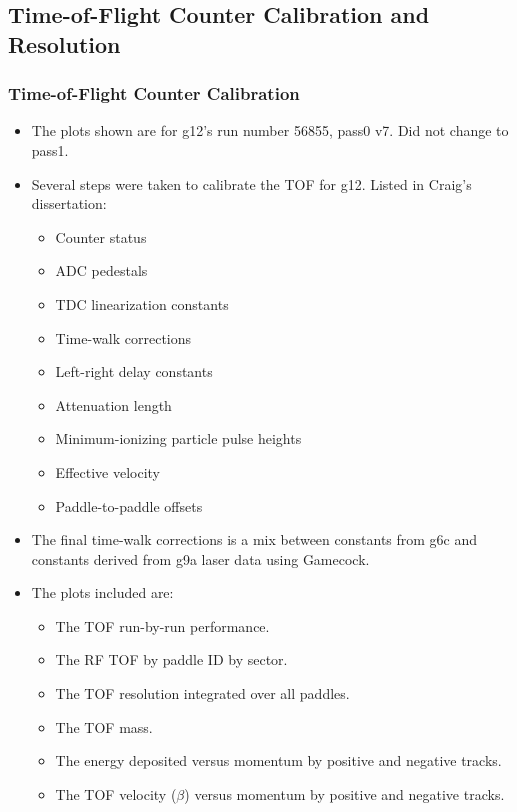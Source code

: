 \subsection{\label{sec:calib.tof}Time-of-Flight Counter Calibration and Resolution}

\subsubsection{\label{sec:calib.tof.calib}Time-of-Flight Counter Calibration}

\begin{itemize}
    \item The plots shown are for g12's run number 56855, pass0 v7. Did not change to pass1.
    \item Several steps were taken to calibrate the TOF for g12. Listed in Craig's dissertation:
    \begin{itemize}
        \item Counter status
        \item ADC pedestals
        \item TDC linearization constants
        \item Time-walk corrections
        \item Left-right delay constants
        \item Attenuation length
        \item Minimum-ionizing particle pulse heights
        \item Effective velocity
        \item Paddle-to-paddle offsets
    \end{itemize}
    \item The final time-walk corrections is a mix between constants from g6c and constants derived from g9a laser data using Gamecock.
    \item The plots included are:
    \begin{itemize}
        \item The TOF run-by-run performance.
        \item The RF TOF by paddle ID by sector.
        \item The TOF resolution integrated over all paddles.
        \item The TOF mass.
        \item The energy deposited versus momentum by positive and negative tracks.
        \item The TOF velocity ($\beta$) versus momentum by positive and negative tracks.
    \end{itemize}
\end{itemize}

